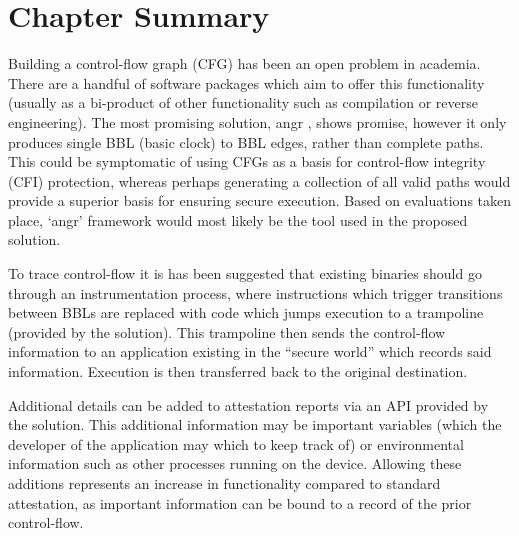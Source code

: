 \section{Chapter Summary}
Building a control-flow graph (CFG) has been an open problem in academia. There are a handful of software packages which aim to offer this functionality (usually as a bi-product of other functionality such as compilation or reverse engineering). The most promising solution, angr \cite{Shoshitaishvili2016}, shows promise, however it only produces single BBL (basic clock) to BBL edges, rather than complete paths. This could be symptomatic of using CFGs as a basis for control-flow integrity (CFI) protection, whereas perhaps generating a collection of all valid paths would provide a superior basis for ensuring secure execution. Based on evaluations taken place, `angr' framework would most likely be the tool used in the proposed solution.

To trace control-flow it is has been suggested that existing binaries should go through an instrumentation process, where instructions which trigger transitions between BBLs are replaced with code which jumps execution to a trampoline (provided by the solution). This trampoline then sends the control-flow information to an application existing in the ``secure world'' which records said information. Execution is then transferred back to the original destination.

Additional details can be added to attestation reports via an API provided by the solution. This additional information may be important variables (which the developer of the application may which to keep track of) or environmental information such as other processes running on the device. Allowing these additions represents an increase in functionality compared to standard attestation, as important information can be bound to a record of the prior control-flow.